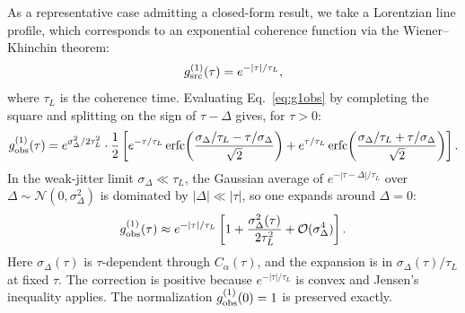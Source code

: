 \documentclass[aps,prd,onecolumn,amsmath,amssymb]{revtex4-2}
\begin{document}
As a representative case admitting a closed-form result, we take a Lorentzian
line profile, which corresponds to an exponential coherence function via the
Wiener--Khinchin theorem:
\begin{equation}
  g^{(1)}_{\rm src}(\tau) = e^{-|\tau|/\tau_L},
  \label{eq:g1src_lorentz}
\end{equation}
where $\tau_L$ is the coherence time.
Evaluating Eq.~\eqref{eq:g1obs} by completing the square and splitting on the
sign of $\tau-\Delta$ gives, for $\tau > 0$:
\begin{equation}
  g^{(1)}_{\rm obs}(\tau)
  = e^{\sigma_\Delta^2/2\tau_L^2}
    \cdot\frac{1}{2}\left[
      e^{-\tau/\tau_L}\,\mathrm{erfc}\!\left(\frac{\sigma_\Delta/\tau_L - \tau/\sigma_\Delta}{\sqrt{2}}\right)
      + e^{\tau/\tau_L}\,\mathrm{erfc}\!\left(\frac{\sigma_\Delta/\tau_L + \tau/\sigma_\Delta}{\sqrt{2}}\right)
    \right].
  \label{eq:g1obs_erfc}
\end{equation}
In the weak-jitter limit $\sigma_\Delta \ll \tau_L$, the Gaussian average of
$e^{-|\tau-\Delta|/\tau_L}$ over $\Delta\sim\mathcal{N}(0,\sigma_\Delta^2)$
is dominated by $|\Delta|\ll|\tau|$, so one expands around $\Delta=0$:
\begin{equation}
  g^{(1)}_{\rm obs}(\tau) \approx e^{-|\tau|/\tau_L}
  \left[1 + \frac{\sigma_\Delta^2(\tau)}{2\tau_L^2} + \mathcal{O}(\sigma_\Delta^4)\right].
  \label{eq:g1weak}
\end{equation}
Here $\sigma_\Delta(\tau)$ is $\tau$-dependent through $C_\alpha(\tau)$,
and the expansion is in $\sigma_\Delta(\tau)/\tau_L$ at fixed $\tau$.
The correction is positive because $e^{-|\tau|/\tau_L}$ is convex and
Jensen's inequality applies.
The normalization $g^{(1)}_{\rm obs}(0) = 1$ is preserved exactly.
\end{document}

